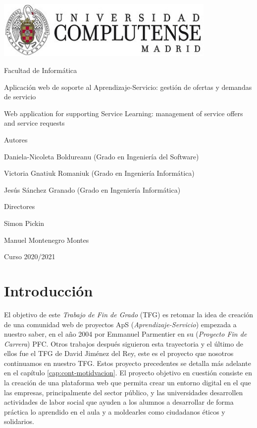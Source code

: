 \documentclass[11pt]{book}
\begin{document}
	\begin{titlepage}
		\centering
		{\includegraphics[width=0.8\textwidth]{logo}\par}
		\vspace{1cm}
		{\Large Facultad de Informática \par}
		\vspace{1cm}
		{\Huge Aplicación web de soporte al Aprendizaje-Servicio: gestión de ofertas y demandas de servicio\par}
		\vspace{1cm}
		{\Huge Web application for supporting Service Learning: management of service offers and service requests \par}
		\vspace{2cm}
		{\textbf\Large Autores \par}
		{\Large Daniela-Nicoleta Boldureanu (Grado en Ingeniería del Software)\par}
		{\Large Victoria Gnatiuk Romaniuk (Grado en Ingeniería Informática)\par}
		{\Large Jesús Sánchez Granado (Grado en Ingeniería Informática)\par}
		\vspace{1cm}
		{\textbf\Large Directores \par}
		{\Large Simon Pickin \par}
		{\Large Manuel Montenegro Montes \par}
		\vspace{2cm}
		{\Large Curso 2020/2021 \par}
	\end{titlepage}
	
	\tableofcontents
	\newpage
	\listoffigures
	
	\chapter{Introducción}
	El objetivo de este \textit{Trabajo de Fin de Grado} (TFG) es retomar la idea de creación de una comunidad web de proyectos ApS (\emph{Aprendizaje-Servicio}) empezada a nuestro saber, en el año 2004 por Emmanuel Parmentier en su (\emph{Proyecto Fin de Carrera}) PFC. Otros trabajos después siguieron esta trayectoria y el último de ellos fue el TFG de David Jiménez del Rey, este es el proyecto que nosotros continuamos en nuestro TFG. Estos proyecto precedentes se detalla más adelante en el capítulo \ref{cap:cont-motidvacion}. El proyecto objetivo en cuestión consiste en la creación de una plataforma web que permita crear un entorno digital en el que las empresas, principalmente del sector público, y las universidades desarrollen actividades de labor social que ayuden a los alumnos a desarrollar de forma práctica lo aprendido en el aula y a moldearles como ciudadanos éticos y solidarios.
	
\end{document}
